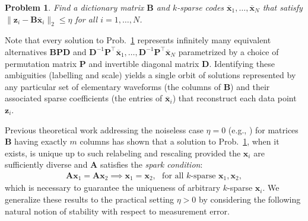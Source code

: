 \documentclass[journal, twocolumn]{IEEEtran}
\newtheorem{problem}{Problem}
\begin{document}
\begin{problem}\label{InverseProblem}
Find a dictionary matrix $\mathbf{B}$ and $k$-sparse codes $\mathbf{\overline x}_1, \ldots, \mathbf{\overline x}_N$ that satisfy $\|\mathbf{z}_i - \mathbf{B}\mathbf{\overline x}_i\|_2 \leq \eta$ for all $i = 1,\ldots,N$.
\end{problem}

Note that every solution to Prob.~\ref{InverseProblem} represents infinitely many equivalent alternatives $\mathbf{BPD}$ and $\mathbf{D}^{-1}\mathbf{P}^{\top}\mathbf{\overline x}_1, \ldots, \mathbf{D}^{-1}\mathbf{P}^{\top}\mathbf{\overline x}_N$ parametrized by a choice of permutation matrix $\mathbf{P}$ and invertible diagonal matrix $\mathbf{D}$. 
Identifying these ambiguities (labelling and scale) yields a single orbit of solutions represented by any particular set of elementary waveforms (the columns of $\mathbf{B}$) and their associated sparse coefficients (the entries of $\mathbf{\overline x}_i$) that reconstruct each data point $\mathbf{z}_i$. 

Previous theoretical work addressing the noiseless case $\eta =0$ (e.g., \cite{li2004analysis, Georgiev05, Aharon06, Hillar15}) for matrices $\mathbf{B}$ having exactly $m$ columns has shown that a solution to Prob.~\ref{InverseProblem}, when it exists, is unique up to such relabeling and rescaling provided the $\mathbf{x}_i$ are sufficiently diverse and $\mathbf{A}$ satisfies the \textit{spark condition}:
\begin{align}\label{SparkCondition}
\mathbf{A}\mathbf{x}_1 = \mathbf{A}\mathbf{x}_2 \implies \mathbf{x}_1 = \mathbf{x}_2, \ \ \ \text{for all $k$-sparse } \mathbf{x}_1, \mathbf{x}_2,
\end{align}
%
which is necessary to guarantee the uniqueness of arbitrary $k$-sparse $\mathbf{x}_i$. We generalize these results to the practical setting  $\eta > 0$ by considering the following natural notion of stability with respect to measurement error.
\end{document}
